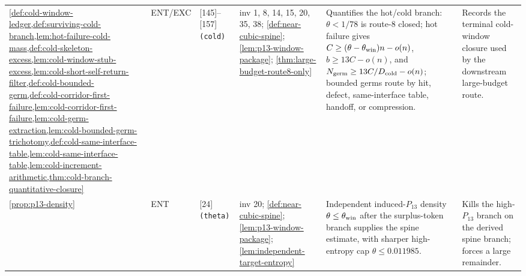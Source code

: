 \documentclass[11pt]{article}
\begin{document}
{\begin{longtable}{L{0.10\textwidth} C{0.045\textwidth} L{0.13\textwidth} L{0.135\textwidth} L{0.28\textwidth} L{0.20\textwidth}}
\cref{def:cold-window-ledger,def:surviving-cold-branch,lem:hot-failure-cold-mass,def:cold-skeleton-excess,lem:cold-window-stub-excess,lem:cold-short-self-return-filter,def:cold-bounded-germ,def:cold-corridor-first-failure,lem:cold-corridor-first-failure,lem:cold-germ-extraction,lem:cold-bounded-germ-trichotomy,def:cold-same-interface-table,lem:cold-same-interface-table,lem:cold-increment-arithmetic,thm:cold-branch-quantitative-closure} & ENT\slash EXC & [145]--[157] \texttt{(cold)} & inv 1, 8, 14, 15, 20, 35, 38; \cref{def:near-cubic-spine}; \cref{lem:p13-window-package}; \cref{thm:large-budget-route8-only} & Quantifies the hot/cold branch: \(\theta<1/78\) is route-8 closed; hot failure gives \(C\ge(\theta-\theta_{\rm win})n-o(n)\), \(b\ge13C-o(n)\), and \(N_{\rm germ}\ge13C/D_{\rm cold}-o(n)\); bounded germs route by hit, defect, same-interface table, handoff, or compression. & Records the terminal cold-window closure used by the downstream large-budget route. \\
\cref{prop:p13-density} & ENT & [24] \texttt{(theta)} & inv 20; \cref{def:near-cubic-spine}; \cref{lem:p13-window-package}; \cref{lem:independent-target-entropy} & Independent induced-$P_{13}$ density $\theta\le\theta_{\rm win}$ after the surplus-token branch supplies the spine estimate, with sharper high-entropy cap $\theta\le0.011985$. & Kills the high-$P_{13}$ branch on the derived spine branch; forces a large remainder. \\
\bottomrule
\end{longtable}
}
\end{document}
